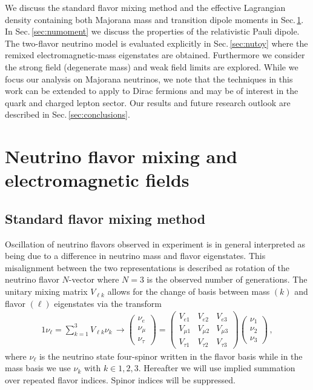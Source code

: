 \documentclass{ws-ijmpa}
\newcommand{\rsec}[1]{Sec.\,{\ref{#1}}}
\begin{document}
We discuss  the standard flavor mixing method and the effective Lagrangian density containing both Majorana mass and transition dipole moments in \rsec{sec:nuflavor}.  In \rsec{sec:numoment} we discuss the properties of the relativistic Pauli dipole. The two-flavor neutrino model is evaluated explicitly in \rsec{sec:nutoy} where the remixed electromagnetic-mass eigenstates are obtained. Furthermore we consider the strong field (degenerate mass) and weak field limits are explored. While we focus our analysis on Majorana neutrinos, we note that the techniques in this work can be extended to apply to Dirac fermions and may be of interest in the quark and charged lepton sector. Our results and future research outlook are described in \rsec{sec:conclusions}.

\section{Neutrino flavor mixing and electromagnetic fields}
\label{sec:nuflavor}
\subsection{Standard flavor mixing method}
\label{sec:numethod}
Oscillation of neutrino flavors observed in experiment is in general interpreted as being due to a difference in neutrino mass and flavor eigenstates. This misalignment between the two representations is described as rotation of the neutrino flavor $N$-vector where $N=3$ is the observed number of generations. The unitary mixing matrix $V_{\ell k}$ allows for the change of basis between mass $(k)$ and flavor $(\ell)$ eigenstates via the transform 
\begin{alignat}{1}
\label{basis:1} \nu_{\ell}=\sum_{k=1}^{3}V_{\ell k}\nu_{k}\,\rightarrow
\begin{pmatrix}
\nu_{e}\\
\nu_{\mu}\\
\nu_{\tau}
\end{pmatrix}=
\begin{pmatrix}
V_{e1} & V_{e2} & V_{e3}\\
V_{\mu1} & V_{\mu2} & V_{\mu3}\\
V_{\tau1} & V_{\tau2} & V_{\tau3}
\end{pmatrix}
\begin{pmatrix}
\nu_{1}\\
\nu_{2}\\
\nu_{3}
\end{pmatrix}\,,
\end{alignat}
where $\nu_{\ell}$ is the neutrino state four-spinor written in the flavor basis while in the mass basis we use $\nu_{k}$ with $k\in1,2,3$. Hereafter we will use implied summation over repeated flavor indices. Spinor indices will be suppressed.
\end{document}
